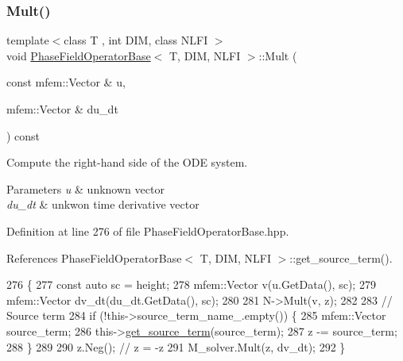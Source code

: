 \subsubsection{\texorpdfstring{Mult()}{Mult()}}
{\footnotesize\ttfamily template$<$class T , int D\+IM, class N\+L\+FI $>$ \\
void \hyperlink{classPhaseFieldOperatorBase}{Phase\+Field\+Operator\+Base}$<$ T, D\+IM, N\+L\+FI $>$\+::Mult (\begin{DoxyParamCaption}\item[{const mfem\+::\+Vector \&}]{u,  }\item[{mfem\+::\+Vector \&}]{du\+\_\+dt }\end{DoxyParamCaption}) const\hspace{0.3cm}{\ttfamily [virtual]}}



Compute the right-\/hand side of the O\+DE system. 


\begin{DoxyParams}{Parameters}
{\em u} & unknown vector \\
\hline
{\em du\+\_\+dt} & unkwon time derivative vector \\
\hline
\end{DoxyParams}


Definition at line 276 of file Phase\+Field\+Operator\+Base.\+hpp.



References Phase\+Field\+Operator\+Base$<$ T, D\+I\+M, N\+L\+F\+I $>$\+::get\+\_\+source\+\_\+term().


\begin{DoxyCode}
276                                                                                             \{
277   \textcolor{keyword}{const} \textcolor{keyword}{auto} sc = height;
278   mfem::Vector v(u.GetData(), sc);
279   mfem::Vector dv\_dt(du\_dt.GetData(), sc);
280 
281   N->Mult(v, z);
282 
283   \textcolor{comment}{// Source term}
284   \textcolor{keywordflow}{if} (!this->source\_term\_name\_.empty()) \{
285     mfem::Vector source\_term;
286     this->\hyperlink{classPhaseFieldOperatorBase_ade4aaf43e627fdc8b2a3690839e225d3}{get\_source\_term}(source\_term);
287     z -= source\_term;
288   \}
289 
290   z.Neg();  \textcolor{comment}{// z = -z}
291   M\_solver.Mult(z, dv\_dt);
292 \}
\end{DoxyCode}
\mbox{\label{classPhaseFieldOperatorBase_ae28add1cf3731d10726a9665862a725b}} 
